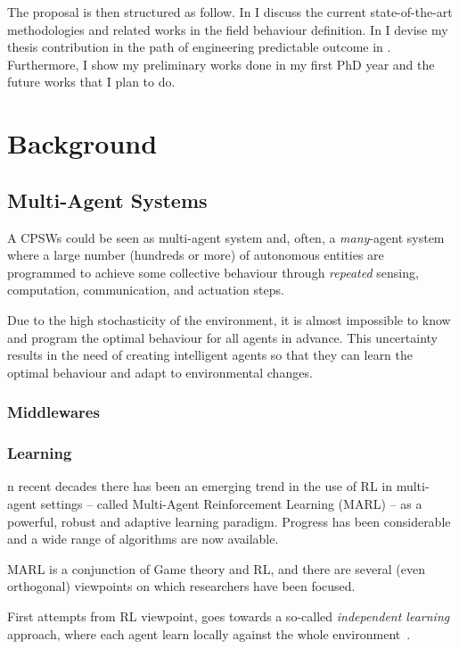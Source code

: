 \documentclass[11pt]{article}
\begin{document}
The proposal is then structured as follow. In  I discuss the current state-of-the-art methodologies and related works in the field \cpws behaviour definition.
In  I devise my thesis contribution in the path of engineering predictable outcome in \cpws. Furthermore, I show my preliminary works done in my first PhD year and the future works that I plan to do. 


\section{Background} \label{background}
\subsection{Multi-Agent Systems}
A CPSWs could be seen as multi-agent system and, often, a \emph{many}-agent system
 where a large number (hundreds or more)
 of autonomous entities are programmed to achieve 
 some collective behaviour through \emph{repeated} 
 sensing, computation, communication, and actuation steps.

Due to the high stochasticity of the environment,
  it is almost impossible to know and
  program the optimal behaviour for all agents in advance.
  This uncertainty results in the need of creating intelligent agents
  so that they can learn the optimal behaviour and adapt to environmental changes.
\subsubsection{Middlewares}
\subsubsection{Learning}
n recent decades there has been an emerging trend in the use of RL 
in multi-agent settings -- called Multi-Agent Reinforcement Learning (MARL) -- as a powerful, robust and adaptive learning paradigm.
Progress has been considerable and a wide range of algorithms are now available.

MARL is a conjunction of Game theory and RL, 
 and there are several (even orthogonal) viewpoints on which researchers have been focused.

First attempts from RL viewpoint, 
 goes towards a so-called \textit{independent learning}~\cite{DBLP:journals/tsmc/BusoniuBS08} approach, 
 where each agent learn locally against the whole environment~\cite{DBLP:conf/icml/Tan93}.
\end{document}
